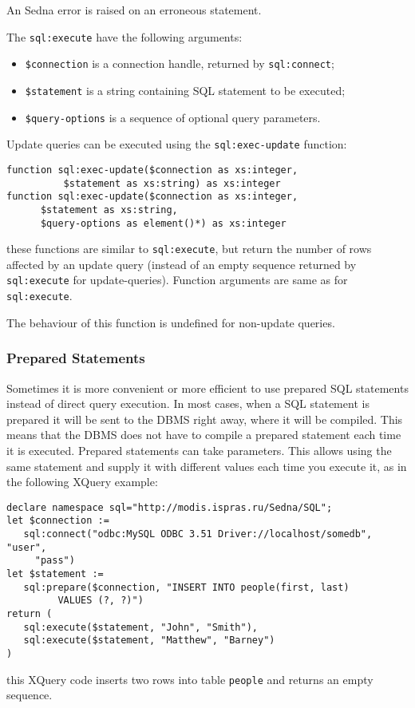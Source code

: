 \documentclass[a4paper,12pt]{article}
\begin{document}
An Sedna error is raised on an erroneous statement.

The \verb!sql:execute! have the following arguments:
\begin{itemize}
\item \verb!$connection! is a connection handle, returned by \verb!sql:connect!;
\item \verb!$statement! is a string containing SQL statement to be executed;
\item \verb!$query-options! is a sequence of optional query parameters.
\end{itemize}

Update queries can be executed using the \verb!sql:exec-update! function:
\begin{verbatim}
function sql:exec-update($connection as xs:integer,
          $statement as xs:string) as xs:integer
function sql:exec-update($connection as xs:integer,
      $statement as xs:string,
      $query-options as element()*) as xs:integer
\end{verbatim}
these functions are similar to \verb!sql:execute!, but return the number
of rows affected by an update query (instead of an empty sequence returned by
\verb!sql:execute! for update-queries). Function arguments are same as for \verb!sql:execute!.

The behaviour of this function is undefined for non-update queries.



\subsubsection*{Prepared Statements}
Sometimes it is more convenient or more efficient to use prepared SQL statements
instead of direct query execution. In most cases, when a SQL statement is
prepared it will be sent to the DBMS right away, where it will be compiled.
This means that the DBMS does not have to compile a prepared statement each time
it is executed.
Prepared statements can take parameters. This allows using the same statement
and supply it with different values each time you execute it, as in the
following XQuery example:
\small{
\begin{verbatim}
declare namespace sql="http://modis.ispras.ru/Sedna/SQL";
let $connection :=
   sql:connect("odbc:MySQL ODBC 3.51 Driver://localhost/somedb", "user",
     "pass")
let $statement :=
   sql:prepare($connection, "INSERT INTO people(first, last)
         VALUES (?, ?)")
return (
   sql:execute($statement, "John", "Smith"),
   sql:execute($statement, "Matthew", "Barney")
)
\end{verbatim}
}
this XQuery code inserts two rows into table \verb!people! and returns an empty
sequence.
\end{document}
